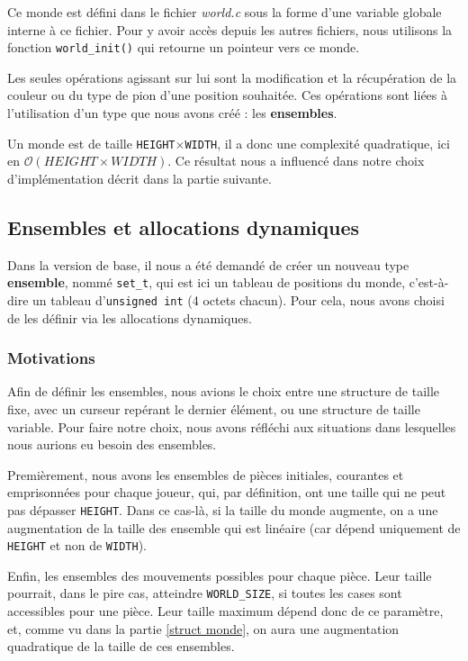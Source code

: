 \documentclass[a4paper]{article}
\begin{document}
Ce monde est défini dans le fichier \emph{world.c} sous la forme d'une variable globale interne à ce fichier. Pour y avoir accès depuis les autres fichiers, nous utilisons la fonction \verb|world_init()| qui retourne un pointeur vers ce monde.

Les seules opérations agissant sur lui sont la modification et la récupération de la couleur ou du type de pion d'une position souhaitée. Ces opérations sont liées à l'utilisation d'un type que nous avons créé : les \textbf{ensembles}.

Un monde est de taille \verb|HEIGHT|$\times$\verb|WIDTH|, il a donc une complexité quadratique, ici en $\mathcal{O}(HEIGHT\times WIDTH)$. Ce résultat nous a influencé dans notre choix d'implémentation décrit dans la partie suivante.

\subsection{Ensembles et allocations dynamiques}
\label{malloc}

Dans la version de base, il nous a été demandé de créer un nouveau type \textbf{ensemble}, nommé \verb|set_t|, qui est ici un tableau de positions du monde, c'est-à-dire un tableau d'\verb|unsigned int| (4 octets chacun). Pour cela, nous avons choisi de les définir via les allocations dynamiques.

\subsubsection{Motivations}
\label{motiv malloc}

Afin de définir les ensembles, nous avions le choix entre une structure de taille fixe, avec un curseur repérant le dernier élément, ou une structure de taille variable. Pour faire notre choix, nous avons réfléchi aux situations dans lesquelles nous aurions eu besoin des ensembles.

Premièrement, nous avons les ensembles de pièces initiales, courantes et emprisonnées pour chaque joueur, qui, par définition, ont une taille qui ne peut pas dépasser \verb|HEIGHT|. Dans ce cas-là, si la taille du monde augmente, on a une augmentation de la taille des ensemble qui est linéaire (car dépend uniquement de \verb|HEIGHT| et non de \verb|WIDTH|).

Enfin, les ensembles des mouvements possibles pour chaque pièce. Leur taille pourrait, dans le pire cas, atteindre \verb|WORLD_SIZE|, si toutes les cases sont accessibles pour une pièce. Leur taille maximum dépend donc de ce paramètre, et, comme vu dans la partie \ref{struct monde}, on aura une augmentation quadratique de la taille de ces ensembles.
\end{document}
